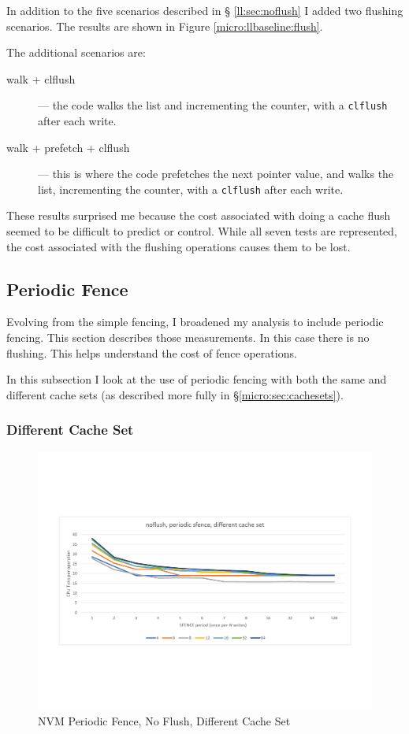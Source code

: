 In addition to the five scenarios described in \S 
\ref{ll:sec:noflush} I added two flushing scenarios.  The
results are shown in Figure \ref{micro:llbaseline:flush}.

The additional scenarios are:

\begin{description}
    \item[walk + clflush] --- the code walks the list and incrementing the counter, with a \texttt{clflush} after each write.
    \item[walk + prefetch + clflush] --- this is where the code prefetches the next pointer value, and walks the list, incrementing the counter, with a \texttt{clflush} after each write.
\end{description}

These results surprised me because the cost associated with
doing a cache flush seemed to be difficult to predict or control. While all seven tests are represented, the cost associated with the flushing operations causes them to be
lost.

\subsection{Periodic Fence}

Evolving from the simple fencing, I broadened my analysis to include periodic fencing.  This section describes those measurements.  In this case there is no flushing.  This helps understand the cost of fence operations. 

In this subsection I look at the use of periodic fencing with both the same and different cache sets (as described more fully in \S \ref{micro:sec:cachesets}).

\subsubsection{Different Cache Set}

\begin{figure}
    \centering
    \caption{NVM Periodic Fence, No Flush, Different Cache Set}\label{micro:sfence:noflush:different}
    \includegraphics[scale=0.35]{micro/nvm-noflush-periodic-different.pdf}
\end{figure}

